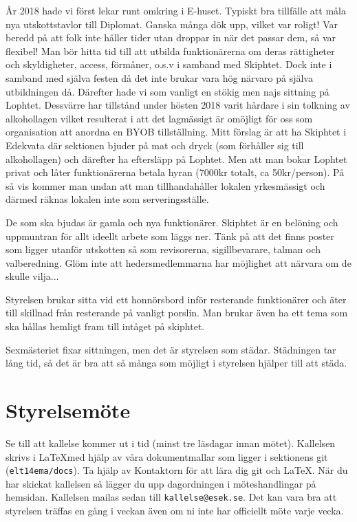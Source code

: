 \documentclass[10pt]{article}
\begin{document}
    År 2018 hade vi först lekar runt omkring i E-huset. Typiskt bra tillfälle att måla nya utskottstavlor till Diplomat. Ganska många dök upp, vilket var roligt! Var beredd på att folk inte håller tider utan droppar in när det passar dem, så var flexibel! Man bör hitta tid till att utbilda funktionärerna om deras rättigheter och skyldigheter, access, förmåner, o.s.v i samband med Skiphtet. Dock inte i samband med själva festen då det inte brukar vara hög närvaro på själva utbildningen då. Därefter hade vi som vanligt en stökig men najs sittning på Lophtet. \newline
    Dessvärre har tillstånd under hösten 2018 varit hårdare i sin tolkning av alkohollagen vilket resulterat i att det lagmässigt är omöjligt för oss som organisation att anordna en BYOB tillställning. Mitt förslag är att ha Skiphtet i Edekvata där sektionen bjuder på mat och dryck (som förhåller sig till alkohollagen) och därefter ha eftersläpp på Lophtet. Men att man bokar Lophtet privat och låter funktionärerna betala hyran (7000kr totalt, ca 50kr/person). På så vis kommer man undan att man tillhandahåller lokalen yrkesmässigt och därmed räknas lokalen inte som serveringsställe. 

    De som ska bjudas är gamla och nya funktionärer. Skiphtet är en belöning och uppmuntran för allt ideellt arbete som läggs ner. Tänk på att det finns poster som ligger utanför utskotten så som revisorerna, sigillbevarare, talman och valberedning. Glöm inte att hedersmedlemmarna har möjlighet att närvara om de skulle vilja...
    
    Styrelsen brukar sitta vid ett honnörsbord inför resterande funktionärer och äter till skillnad från resterande på vanligt porslin. Man brukar även ha ett tema som ska hållas hemligt fram till intåget på skiphtet.
    
    Sexmästeriet fixar sittningen, men det är styrelsen som städar. Städningen tar lång tid, så det är bra att så många som möjligt i styrelsen hjälper till att städa.
    
    \section{Styrelsemöte}
    
    Se till att kallelse kommer ut i tid (minst tre läsdagar innan mötet).
    Kallelsen skrivs i \LaTeX med hjälp av våra dokumentmallar som ligger i sektionens git (\texttt{elt14ema/docs}). Ta hjälp av Kontaktorn för att lära dig git och \LaTeX. När du har skickat kallelsen så lägger du upp dagordningen i möteshandlingar på hemsidan. Kallelsen mailas sedan till \texttt{kallelse@esek.se}. Det kan vara bra att styrelsen träffas en gång i veckan även om ni inte har officiellt möte varje vecka.
    
\end{document}

